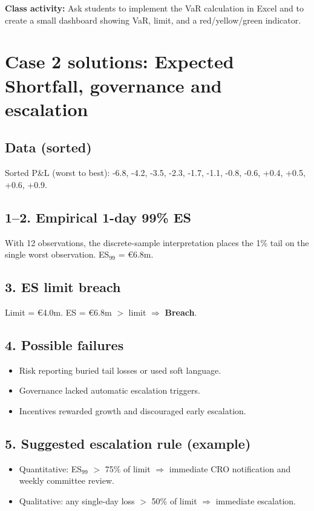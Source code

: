 \documentclass[11pt]{article}
\begin{document}
\textbf{Class activity:} Ask students to implement the VaR calculation in Excel and to create a small dashboard showing VaR, limit, and a red/yellow/green indicator.

\newpage
\section{Case 2 solutions: Expected Shortfall, governance and escalation}
\subsection*{Data (sorted)}
Sorted P\&L (worst to best): -6.8, -4.2, -3.5, -2.3, -1.7, -1.1, -0.8, -0.6, +0.4, +0.5, +0.6, +0.9.

\subsection*{1--2. Empirical 1-day 99\% ES}
With 12 observations, the discrete-sample interpretation places the 1\% tail on the single worst observation. ES$_{99}$ = \euro 6.8m.

\subsection*{3. ES limit breach}
Limit = \euro 4.0m. ES = \euro 6.8m $>$ limit $\Rightarrow$ \textbf{Breach}.

\subsection*{4. Possible failures}
\begin{itemize}
  \item Risk reporting buried tail losses or used soft language.
  \item Governance lacked automatic escalation triggers.
  \item Incentives rewarded growth and discouraged early escalation.
\end{itemize}

\subsection*{5. Suggested escalation rule (example)}
\begin{itemize}
  \item Quantitative: ES$_{99}$ $>$ 75\% of limit $\Rightarrow$ immediate CRO notification and weekly committee review.
  \item Qualitative: any single-day loss $>$ 50\% of limit $\Rightarrow$ immediate escalation.
\end{itemize}
\end{document}
